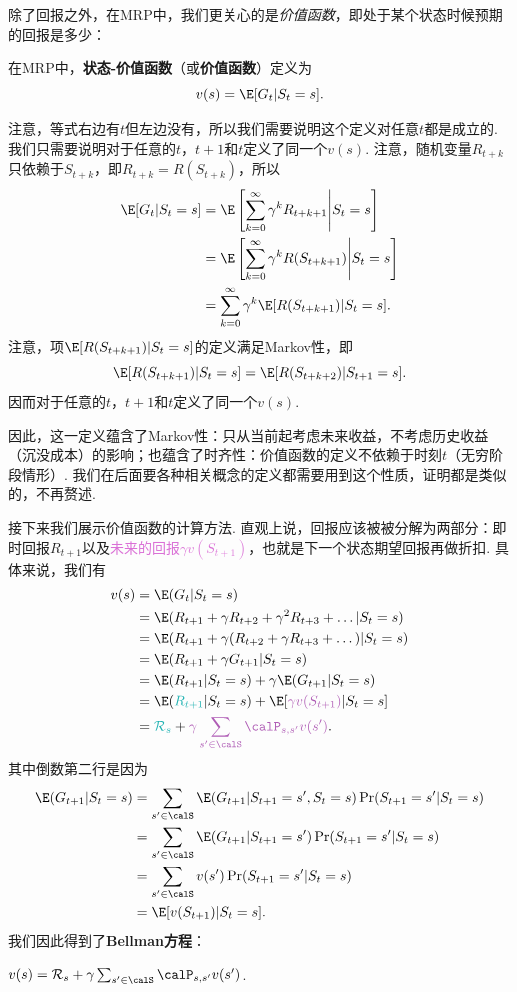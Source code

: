 除了回报之外，在MRP中，我们更关心的是\emph{价值函数}，即处于某个状态时候预期的回报是多少：
\begin{definition}[价值函数]
在MRP中，\textbf{状态-价值函数}（或\textbf{价值函数}）定义为
    \[v(s) = \E[G_t|S_t=s].\]
\end{definition}

注意，等式右边有$t$但左边没有，所以我们需要说明这个定义对任意$t$都是成立的. 我们只需要说明对于任意的$t$，$t+1$和$t$定义了同一个$v(s)$. 注意，随机变量$R_{t+k}$只依赖于$S_{t+k}$，即$R_{t+k}=R(S_{t+k})$，所以
\begin{align*}
    \E[G_t|S_t=s] &= \E\left[\sum_{k=0}^\infty \gamma^k R_{t+k+1}\middle|S_t=s\right] \\
    &= \E\left[\sum_{k=0}^\infty \gamma^k R(S_{t+k+1})\middle|S_t=s\right]\\
    &= \sum_{k=0}^\infty \gamma^k \E[R(S_{t+k+1})|S_t=s].
\end{align*}
注意，项$\E[R(S_{t+k+1})|S_t=s]$的定义满足Markov性，即
\[\E[R(S_{t+k+1})|S_t=s]=\E[R(S_{t+k+2})|S_{t+1}=s].\]
因而对于任意的$t$，$t+1$和$t$定义了同一个$v(s)$.

因此，这一定义蕴含了Markov性：只从当前起考虑未来收益，不考虑历史收益（沉没成本）的影响；也蕴含了时齐性：价值函数的定义不依赖于时刻$t$（无穷阶段情形）. 我们在后面要各种相关概念的定义都需要用到这个性质，证明都是类似的，不再赘述.

接下来我们展示价值函数的计算方法. 直观上说，回报应该被被分解为两部分：\textcolor{TealBlue}{即时回报$R_{t+1}$}以及\textcolor{Orchid}{未来的回报$\gamma v(S_{t+1})$}，也就是下一个状态期望回报再做折扣. 具体来说，我们有
\begin{align*}
v(s) &= \E(G_t|S_t=s) \\
    &= \E(R_{t+1}+ \gamma R_{t+2} + \gamma^2 R_{t+3}+\dots | S_t= s) \\
    &= \E(R_{t+1} + \gamma (R_{t+2}+\gamma R_{t+3}+\dots) | S_t = s) \\
    &= \E(R_{t+1} + \gamma G_{t+1} | S_t = s) \\
    &= \E(R_{t+1} | S_t = s) + \gamma \E(G_{t+1} | S_t = s) \\
    &= \E(\textcolor{TealBlue}{R_{t+1}}|S_t=s) + \E[\textcolor{Orchid}{\gamma v(S_{t+1})}|S_t=s]\\
    &= \textcolor{TealBlue}{\mathcal R_s} + \textcolor{Orchid}{\gamma \sum_{s'\in \calS}\calP_{s,s'}v(s')}.
\end{align*}
其中倒数第二行是因为
\begin{align*}
    \E(G_{t+1}|S_t=s) &= \sum_{s'\in \calS}\E(G_{t+1}|S_{t+1}=s',S_t=s)\Pr(S_{t+1}=s'|S_t=s)\\
    &= \sum_{s'\in \calS}\E(G_{t+1}|S_{t+1}=s')\Pr(S_{t+1}=s'|S_t=s)\\
    &= \sum_{s'\in \calS}v(s')\Pr(S_{t+1}=s'|S_t=s)\\
    &=\E[v(S_{t+1})|S_t=s].
\end{align*}
我们因此得到了\textbf{Bellman方程}：
\begin{theorem}[Bellman方程]\label{thm:MRP-Bellman}
    $v(s)=\mathcal R_s + \gamma \sum_{s'\in \calS}\calP_{s,s'}v(s')$.
\end{theorem}

